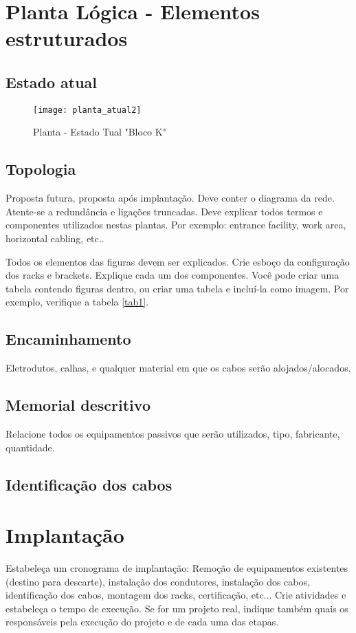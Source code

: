 \documentclass[	DIV=calc,%
							paper=a4,%
							fontsize=12pt,%
							onecolumn]{scrartcl}	 					%
\begin{document}
\section{Planta Lógica - Elementos estruturados}

\subsection{Estado atual}
\begin{figure}
	\centering
	\caption{Planta - Estado Tual "Bloco K"}
	\texttt{[image: planta\_atual2]}
\end{figure}

\subsection{Topologia}
Proposta futura, proposta após implantação.
Deve conter o diagrama da rede. Atente-se a redundância  e ligações truncadas.
Deve explicar todos termos e componentes utilizados nestas plantas. Por exemplo: entrance facility, work area, horizontal cabling, etc..

Todos os elementos das figuras devem ser explicados. 
Crie esboço da configuração dos racks e brackets. Explique cada um dos componentes. Você pode criar uma tabela contendo figuras dentro, ou criar uma tabela e incluí-la como imagem. Por exemplo, verifique a tabela \ref{tab1}.



\subsection{Encaminhamento}
Eletrodutos, calhas, e qualquer material em que os cabos serão alojados/alocados.

\subsection{Memorial descritivo}

Relacione todos os equipamentos passivos que serão utilizados, tipo, fabricante, quantidade.

\subsection{Identificação dos cabos}

\section{Implantação}
Estabeleça um cronograma de implantação:
Remoção de equipamentos existentes (destino para descarte), instalação dos condutores, instalação dos cabos, 
identificação dos cabos, montagem dos racks, certificação, etc... Crie atividades e estabeleça o tempo de execução. Se for um projeto real, indique também quais os responsáveis pela execução do projeto e de cada uma das etapas.
\end{document}
